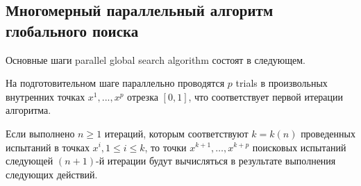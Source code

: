 \documentclass{svproc}
\begin{document}
\subsection{Многомерный параллельный алгоритм глобального поиска}\label{SecGSA}

Основные шаги parallel global search algorithm состоят в следующем.

На подготовительном шаге параллельно проводятся $p$ trials в произвольных внутренних точках $x^1, ...,x^p$ отрезка $[0,1]$, что соответствует первой итерации  алгоритма. 

Если выполнено $n \geq 1$ итераций, которым соответствуют $k=k(n)$ проведенных испытаний в точках $x^i, 1\leq i\leq k$, то точки $x^{k+1},\ldots,x^{k+p}$ поисковых испытаний следующей $(n+1)$-й итерации будут вычисляться в результате выполнения следующих действий.
\end{document}
